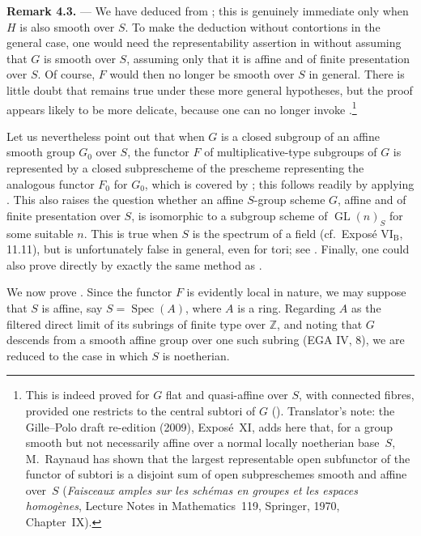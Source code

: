 \medskip
\noindent{}\textbf{Remark 4.3.} ---
We have deduced  from
; this is genuinely immediate
only when \(H\) is also smooth over \(S\).  To make the deduction
without contortions in the general case, one would need the
representability assertion in
 without assuming that \(G\) is
smooth over \(S\), assuming only that it is affine and of finite
presentation over \(S\).  Of course, \(F\) would then no longer be
smooth over \(S\) in general.  There is little doubt that
 remains true under these more
general hypotheses, but the proof appears likely to be more delicate,
because one can no longer invoke
.\footnote{This is indeed
proved for \(G\) flat and quasi-affine over \(S\), with connected
fibres, provided one restricts to the central subtori of \(G\)
().  Translator's note: the Gille--Polo
draft re-edition (2009), Exposé~XI, adds here that, for a group smooth but not necessarily
affine over a normal locally noetherian base~\(S\), M.~Raynaud has shown that the largest
representable open subfunctor of the functor of subtori is a disjoint sum of open
subpreschemes smooth and affine over~\(S\) (\emph{Faisceaux amples sur les schémas en
groupes et les espaces homogènes}, Lecture Notes in Mathematics~119, Springer, 1970,
Chapter~IX).}

Let us nevertheless point out that when \(G\) is a closed subgroup
of an affine smooth group \(G_0\) over \(S\), the functor \(F\) of
multiplicative-type subgroups of \(G\) is represented by a closed
subprescheme of the prescheme representing the analogous functor
\(F_0\) for \(G_0\), which is covered by
; this follows readily by
applying .  This also raises the question whether an
affine \(S\)-group scheme \(G\), affine and of finite presentation
over \(S\), is isomorphic to a subgroup scheme of
\(\operatorname{GL}(n)_S\) for some suitable \(n\).  This is true
when \(S\) is the spectrum of a field (cf.\ Exposé
\(\mathrm{VI}_{\mathrm B}\), 11.11), but is unfortunately false in
general, even for tori; see
.  Finally, one could also prove
 directly by exactly the same
method as .

We now prove .  Since the
functor \(F\) is evidently local in nature, we may suppose that
\(S\) is affine, say \(S=\operatorname{Spec}(A)\), where \(A\) is a
ring.  Regarding \(A\) as the filtered direct limit of its subrings
of finite type over \(\mathbb Z\), and noting that \(G\) descends
from a smooth affine group over one such subring (EGA IV, 8), we are
reduced to the case in which \(S\) is noetherian.

